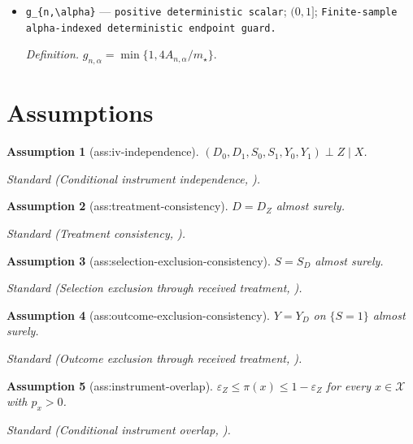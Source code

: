 \documentclass{article}
\newtheorem{assumption}{Assumption}
\begin{document}
\begin{itemize}
  \par\smallskip\noindent\emph{Definition.} \(A_{n,\alpha}=64K|\mathcal X|b_{n,\alpha}/\varepsilon_Z^2+|\mathcal X|\eta_n.\)
  \item \texttt{g\_\allowbreak{}\{n,\allowbreak{}\textbackslash{}\allowbreak{}alpha\}\allowbreak{}} --- \texttt{positive deterministic scalar}; \((0,1]\); \texttt{Finite-\allowbreak{}sample alpha-\allowbreak{}indexed deterministic endpoint guard.}
  \par\smallskip\noindent\emph{Definition.} \(g_{n,\alpha}=\min\{1,4A_{n,\alpha}/m_{\star}\}.\)
\end{itemize}

\section{Assumptions}

\begin{assumption}[ass:iv-independence]\label{ass:iv-independence}
\((D_0,D_1,S_0,S_1,Y_0,Y_1)\perp Z\mid X\).
\par\smallskip\noindent\emph{Standard} (Conditional instrument independence, \cite{AngristImbensRubin1996}).
\end{assumption}

\begin{assumption}[ass:treatment-consistency]\label{ass:treatment-consistency}
\(D=D_Z\) almost surely.
\par\smallskip\noindent\emph{Standard} (Treatment consistency, \cite{AngristImbensRubin1996}).
\end{assumption}

\begin{assumption}[ass:selection-exclusion-consistency]\label{ass:selection-exclusion-consistency}
\(S=S_D\) almost surely.
\par\smallskip\noindent\emph{Standard} (Selection exclusion through received treatment, \cite{KennedyHarrisKeele2019}).
\end{assumption}

\begin{assumption}[ass:outcome-exclusion-consistency]\label{ass:outcome-exclusion-consistency}
\(Y=Y_D\) on \(\{S=1\}\) almost surely.
\par\smallskip\noindent\emph{Standard} (Outcome exclusion through received treatment, \cite{KennedyHarrisKeele2019}).
\end{assumption}

\begin{assumption}[ass:instrument-overlap]\label{ass:instrument-overlap}
\(\varepsilon_Z\le\pi(x)\le1-\varepsilon_Z\) for every \(x\in\mathcal X\) with \(p_x>0\).
\par\smallskip\noindent\emph{Standard} (Conditional instrument overlap, \cite{KennedyHarrisKeele2019}).
\end{assumption}
\end{document}
